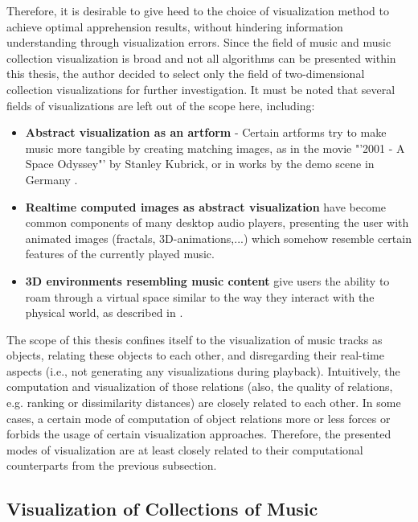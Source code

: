 Therefore, it is desirable to give heed to the choice of visualization method to achieve optimal apprehension results, without hindering information understanding through visualization errors.
Since the field of music and music collection visualization is broad and not all algorithms can be presented within this thesis, the author decided to select only the field of two-dimensional collection visualizations for further investigation. It must be noted that several fields of visualizations are left out of the scope here, including:

\begin{itemize}
	\item \textbf{Abstract visualization as an artform} - Certain artforms try to make music more tangible by creating matching images, as in the movie "'2001 - A Space Odyssey"' by Stanley Kubrick, or in works by the demo scene in Germany \cite{Scheib:2002}.
	\item \textbf{Realtime computed images as abstract visualization} have become common components of many desktop audio players, presenting the user with animated images (fractals, 3D-animations,...) which somehow resemble certain features of the currently played music.
	\item \textbf{3D environments resembling music content} give users the ability to roam through a virtual space similar to the way they interact with the physical world, as described in \cite{Dittenbach:2007}.
\end{itemize}

The scope of this thesis confines itself to the visualization of music tracks as objects, relating these objects to each other, and disregarding their real-time aspects (i.e., not generating any visualizations during playback).
Intuitively, the computation and visualization of those relations (also, the quality of relations, e.g. ranking or dissimilarity distances) are closely related to each other. In some cases, a certain mode of computation of object relations more or less forces or forbids the usage of certain visualization approaches. Therefore, the presented modes of visualization are at least closely related to their computational counterparts from the previous subsection.

\subsection{Visualization of Collections of Music}

